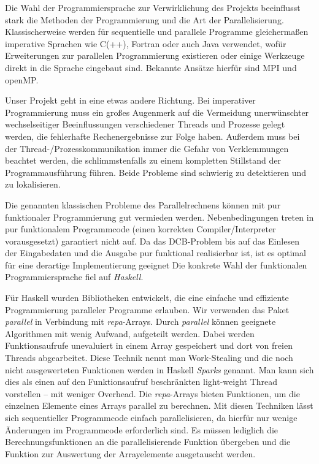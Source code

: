 \documentclass[a4paper]{scrartcl}
\begin{document}
Die Wahl der Programmiersprache zur Verwirklichung des Projekts beeinflusst stark die Methoden der Programmierung und die Art der Parallelisierung. Klassischerweise werden für sequentielle und parallele Programme gleichermaßen imperative Sprachen wie C(++), Fortran oder auch Java verwendet, wofür Erweiterungen zur parallelen Programmierung existieren oder einige Werkzeuge direkt in die Sprache eingebaut sind. Bekannte Ansätze hierfür sind MPI und openMP. \par
Unser Projekt geht in eine etwas andere Richtung. Bei imperativer Programmierung muss ein großes Augenmerk auf die Vermeidung unerwünschter wechselseitiger Beeinflussungen verschiedener Threads und Prozesse gelegt werden, die fehlerhafte Rechenergebnisse zur Folge haben. Außerdem muss bei der Thread-/Prozesskommunikation immer die Gefahr von Verklemmungen beachtet werden, die schlimmstenfalls zu einem kompletten Stillstand der Programmausführung führen. Beide Probleme sind schwierig zu detektieren und zu lokalisieren.\par
Die genannten klassischen Probleme des Parallelrechnens können mit pur funktionaler Programmierung gut vermieden werden. Nebenbedingungen treten in pur funktionalem Programmcode (einen korrekten Compiler/Interpreter vorausgesetzt) garantiert nicht auf. Da das DCB-Problem bis auf das Einlesen der Eingabedaten und die Ausgabe pur funktional realisierbar ist, ist es optimal für eine derartige Implementierung geeignet Die konkrete Wahl der funktionalen Programmiersprache fiel auf \emph{Haskell}. \par
\medskip
Für Haskell wurden Bibliotheken entwickelt, die eine einfache und effiziente Programmierung paralleler Programme erlauben. Wir verwenden das Paket \emph{parallel} in Verbindung mit \emph{repa}-Arrays. Durch \emph{parallel} können geeignete Algorithmen mit wenig Aufwand, aufgeteilt werden. Dabei werden Funktionsaufrufe unevaluiert in einem Array gespeichert und dort von freien Threads abgearbeitet. Diese Technik nennt man Work-Stealing und die noch nicht ausgewerteten Funktionen werden in Haskell \emph{Sparks} genannt. Man kann sich dies als einen auf den Funktionsaufruf beschränkten light-weight Thread vorstellen -- mit weniger Overhead. Die \emph{repa}-Arrays bieten Funktionen, um die einzelnen Elemente eines Arrays parallel zu berechnen. Mit diesen Techniken lässt sich sequentieller Programmcode einfach parallelisieren, da hierfür nur wenige Änderungen im Programmcode erforderlich sind. Es müssen lediglich die Berechnungsfunktionen an die parallelisierende Funktion übergeben und die Funktion zur Auswertung der Arrayelemente ausgetauscht werden. \par
\end{document}
